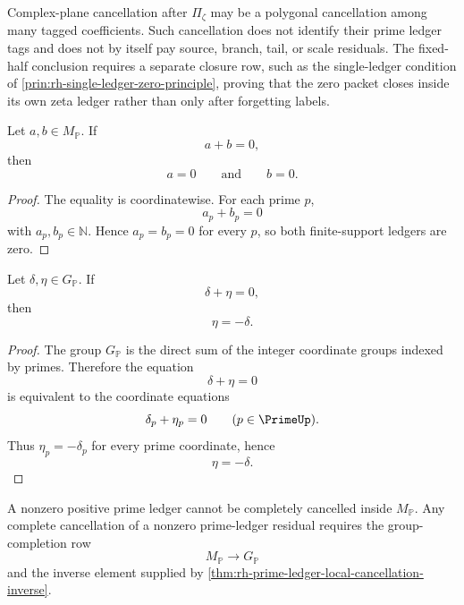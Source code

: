 \begin{principle}
\label{prin:rh-projection-cancellation-not-source-ledger-closure}
Complex-plane cancellation after $\Pi_{\zeta}$ may be a polygonal
cancellation among many tagged coefficients.  Such cancellation does not
identify their prime ledger tags and does not by itself pay source,
branch, tail, or scale residuals.  The fixed-half conclusion requires a
separate closure row, such as the single-ledger condition of
\autoref{prin:rh-single-ledger-zero-principle}, proving that the zero
packet closes inside its own zeta ledger rather than only after forgetting
labels.
\end{principle}

\begin{theorem}
\label{thm:rh-positive-prime-ledgers-no-nonzero-self-cancellation}
Let $a,b\in M_{\mathbb P}$.  If
$$
a+b=0,
$$
then
$$
a=0
\qquad\text{and}\qquad
b=0.
$$
\end{theorem}

\begin{proof}
The equality is coordinatewise.  For each prime $p$,
$$
a_p+b_p=0
$$
with $a_p,b_p\in\mathbb N$.  Hence $a_p=b_p=0$ for every $p$, so both
finite-support ledgers are zero.
\end{proof}

\begin{theorem}
\label{thm:rh-prime-ledger-local-cancellation-inverse}
Let $\delta,\eta\in G_{\mathbb P}$.  If
$$
\delta+\eta=0,
$$
then
$$
\eta=-\delta.
$$
\end{theorem}

\begin{proof}
The group $G_{\mathbb P}$ is the direct sum of the integer coordinate
groups indexed by primes.  Therefore the equation
$$
\delta+\eta=0
$$
is equivalent to the coordinate equations
$$
\delta_p+\eta_p=0
\qquad(p\in\PrimeUp).
$$
Thus $\eta_p=-\delta_p$ for every prime coordinate, hence
$$
\eta=-\delta.
$$
\end{proof}

\begin{corollary}
\label{cor:rh-nonzero-prime-ledger-cancellation-uses-group-completion}
A nonzero positive prime ledger cannot be completely cancelled inside
$M_{\mathbb P}$.  Any complete cancellation of a nonzero prime-ledger
residual requires the group-completion row
$$
M_{\mathbb P}\to G_{\mathbb P}
$$
and the inverse element supplied by
\autoref{thm:rh-prime-ledger-local-cancellation-inverse}.
\end{corollary}

